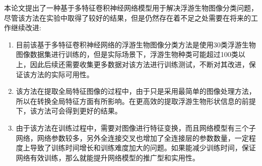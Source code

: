 本论文提出了一种基于多特征卷积神经网络模型用于解决浮游生物图像分类问题，尽管该方法在实验中取得了较好的结果，但是仍然存在着不足之处需要在将来的工作继续改进:

\begin{enumerate}
\item 目前该基于多特征卷积神经网络的浮游生物图像分类方法是使用30类浮游生物图像数据集进行训练的，但是实际场景下，浮游生物种类可能超过100类以上，因此后续还需要收集更多数据对该方法进行训练测试，不断对其改进，保证该方法的实际可用性。
\item 该方法在提取全局特征图像的过程中，由于只是采用最简单的图像处理方法，所以在转换全局特征方面有所影响。在更高效的提取浮游生物形状信息的前提下，该方法可会得到更好的结果。
\item 由于该方法在训练过程中，需要对图像进行特征变换，而且网络模型有三个子网络，网络参数较多，另外全连接交叉也增加了全连接层的参数数量，一定程度上导致了训练时间增长和训练难度加大的问题。如果能减少训练时间，保证网络有效训练，那么就能提升网络模型的推广型和实用性。
\end{enumerate}
